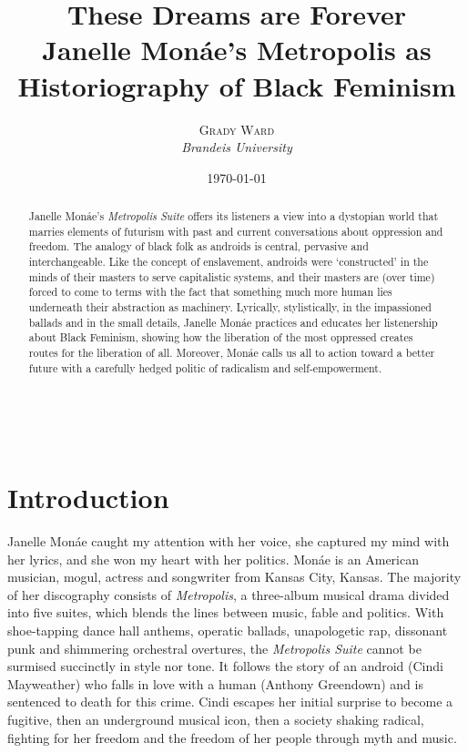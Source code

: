 \documentclass[a4paper, 11pt]{article} %
\title{\linespread{2.1}\textbf{These Dreams are Forever}\\ %
Janelle Mon\'ae's Metropolis as Historiography of Black Feminism} %
\author{\textsc{Grady Ward} %
\\{\textit{Brandeis University}}} %
\date{\today} %
\makeatletter
\renewcommand{\maketitle}{ %
\begin{flushright} %
	{\LARGE\@title} %

	\vspace{40pt} %

	{\large\@author} %
	\\\@date %

	\vspace{30pt} %
\end{flushright}
}
\makeatother
\begin{document}
\maketitle %


\begin{abstract}

Janelle Mon\'ae's \emph{Metropolis Suite} offers its listeners a view into a dystopian world that marries elements of futurism with past and current conversations about oppression and freedom.
The analogy of black folk as androids is central, pervasive and interchangeable. 
Like the concept of enslavement, androids were `constructed' in the minds of their masters to serve capitalistic systems, and their masters are (over time) forced to come to terms with the fact that something much more human lies underneath their abstraction as machinery. 
Lyrically, stylistically, in the impassioned ballads and in the small details, Janelle Mon\'ae practices and educates her listenership about Black Feminism, showing how the liberation of the most oppressed creates routes for the liberation of all.
Moreover, Mon\'ae calls us all to action toward a better future with a carefully hedged politic of radicalism and self-empowerment.

\end{abstract}

\vspace{30pt}


\section*{Introduction}

Janelle Mon\'ae caught my attention with her voice, she captured my mind with her lyrics, and she won my heart with her politics.
Mon\'ae is an American musician, mogul, actress and songwriter from Kansas City, Kansas.
The majority of her discography consists of \emph{Metropolis}, a three-album musical drama divided into five suites, which blends the lines between music, fable and politics.
With shoe-tapping dance hall anthems, operatic ballads, unapologetic rap, dissonant punk and shimmering orchestral overtures, the \emph{Metropolis Suite} cannot be surmised succinctly in style nor tone.
It follows the story of an android (Cindi Mayweather) who falls in love with a human (Anthony Greendown) and is sentenced to death for this crime\cite{wolfmasters}.
Cindi escapes her initial surprise to become a fugitive\cite{manymoons}, then an underground musical icon\cite{favoritefugitive}, then a society shaking radical\cite{fiveseveneighttwoone}, fighting for her freedom and the freedom of her people through myth and music.
\end{document}
